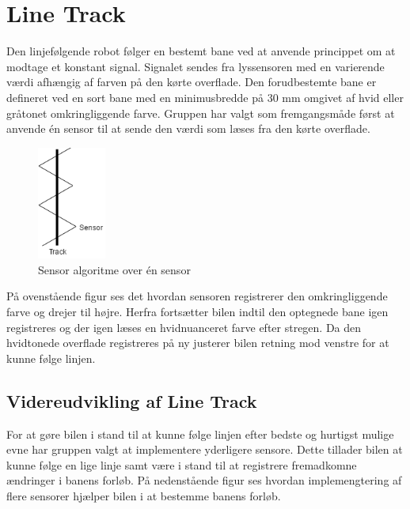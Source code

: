 \section{Line Track}
Den linjefølgende robot følger en bestemt bane ved at anvende princippet om at modtage et konstant signal. Signalet sendes fra lyssensoren med en varierende værdi afhængig af farven på den kørte overflade. 
\newline
Den forudbestemte bane er defineret ved en sort bane med en minimusbredde på 30 mm omgivet af hvid eller gråtonet omkringliggende farve. 
\newline
Gruppen har valgt som fremgangsmåde først at anvende én sensor til at sende den værdi som læses fra den kørte overflade. 

\begin{figure}[h!]
  \centering
  \includegraphics[width=0.2\textwidth]{figures/sensorAlgoritme.png}
  \caption{Sensor algoritme over én sensor}
\end{figure}

På ovenstående figur ses det hvordan sensoren registrerer den omkringliggende farve og drejer til højre. Herfra fortsætter bilen indtil den optegnede bane igen registreres og der igen læses en hvidnuanceret farve efter stregen. Da den hvidtonede overflade registreres på ny justerer bilen retning mod venstre for at kunne følge linjen.  
\newline

\subsection{Videreudvikling af Line Track}
For at gøre bilen i stand til at kunne følge linjen efter bedste og hurtigst mulige evne har gruppen valgt at implementere yderligere sensore. Dette tillader bilen at kunne følge en lige linje samt være i stand til at registrere fremadkomne ændringer i banens forløb.
\newline
På nedenstående figur ses hvordan implemengtering af flere sensorer hjælper bilen i at bestemme banens forløb.

